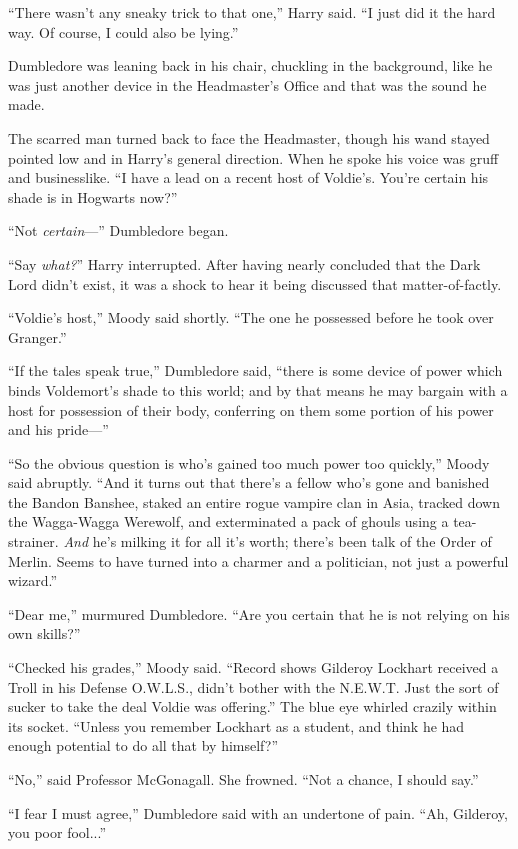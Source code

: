 “There wasn’t any sneaky trick to that one,” Harry said. “I just did it the hard way. Of course, I could also be lying.”

Dumbledore was leaning back in his chair, chuckling in the background, like he was just another device in the Headmaster’s Office and that was the sound he made.

The scarred man turned back to face the Headmaster, though his wand stayed pointed low and in Harry’s general direction. When he spoke his voice was gruff and businesslike. “I have a lead on a recent host of Voldie’s. You’re certain his shade is in Hogwarts now?”

“Not \emph{certain}—” Dumbledore began.

“Say \emph{what?}” Harry interrupted. After having nearly concluded that the Dark Lord didn’t exist, it was a shock to hear it being discussed that matter-of-factly.

“Voldie’s host,” Moody said shortly. “The one he possessed before he took over Granger.”

“If the tales speak true,” Dumbledore said, “there is some device of power which binds Voldemort’s shade to this world; and by that means he may bargain with a host for possession of their body, conferring on them some portion of his power and his pride—”

“So the obvious question is who’s gained too much power too quickly,” Moody said abruptly. “And it turns out that there’s a fellow who’s gone and banished the Bandon Banshee, staked an entire rogue vampire clan in Asia, tracked down the Wagga-Wagga Werewolf, and exterminated a pack of ghouls using a tea-strainer. \emph{And} he’s milking it for all it’s worth; there’s been talk of the Order of Merlin. Seems to have turned into a charmer and a politician, not just a powerful wizard.”

“Dear me,” murmured Dumbledore. “Are you certain that he is not relying on his own skills?”

“Checked his grades,” Moody said. “Record shows Gilderoy Lockhart received a Troll in his Defense O.W.L.S., didn’t bother with the N.E.W.T. Just the sort of sucker to take the deal Voldie was offering.” The blue eye whirled crazily within its socket. “Unless you remember Lockhart as a student, and think he had enough potential to do all that by himself?”

“No,” said Professor McGonagall. She frowned. “Not a chance, I should say.”

“I fear I must agree,” Dumbledore said with an undertone of pain. “Ah, Gilderoy, you poor fool...”

